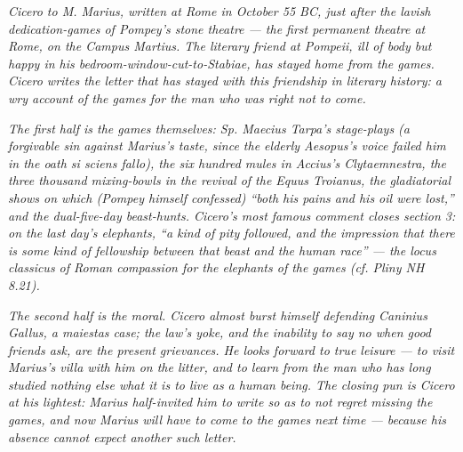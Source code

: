 
\textit{Cicero to M. Marius, written at Rome in October 55 BC,
just after the lavish dedication-games of Pompey's stone
theatre — the first permanent theatre at Rome, on the Campus
Martius. The literary friend at Pompeii, ill of body but happy
in his bedroom-window-cut-to-Stabiae, has stayed home from the
games. Cicero writes the letter that has stayed with this
friendship in literary history: a wry account of the games for
the man who was right not to come.}

\textit{The first half is the games themselves: Sp. Maecius
Tarpa's stage-plays (a forgivable sin against Marius's taste,
since the elderly Aesopus's voice failed him in the oath
\textit{si sciens fallo}), the six hundred mules in Accius's
\textit{Clytaemnestra}, the three thousand mixing-bowls in the
revival of the \textit{Equus Troianus}, the gladiatorial shows
on which (Pompey himself confessed) ``both his pains and his
oil were lost,'' and the dual-five-day beast-hunts. Cicero's
most famous comment closes section 3: on the last day's
elephants, ``a kind of pity followed, and the impression that
there is some kind of fellowship between that beast and the
human race'' --- the locus classicus of Roman compassion for
the elephants of the games (cf. Pliny \textit{NH} 8.21).}

\textit{The second half is the moral. Cicero almost burst
himself defending Caninius Gallus, a maiestas case; the law's
yoke, and the inability to say no when good friends ask, are
the present grievances. He looks forward to true leisure --- to
visit Marius's villa with him on the litter, and to learn from
the man who has long studied nothing else what it is to live as
a human being. The closing pun is Cicero at his lightest:
Marius half-invited him to write so as to not regret missing
the games, and now Marius will have to come to the games next
time --- because his absence cannot expect another such letter.}
